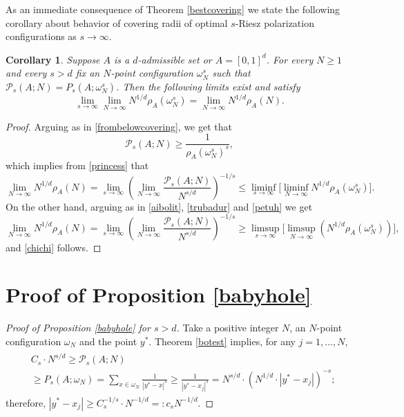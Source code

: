 \documentclass[12pt]{amsart}
\newtheorem{corollary}[theorem]{Corollary}
\theoremstyle{definition}
\def\sli{\sum\limits}
\newcommand{\1}{\mathbf{1}}
\newcommand{\PP}{\mathcal{P}}
\begin{document}
As an immediate consequence of Theorem \ref{bestcovering} we state the following corollary about behavior of covering radii of optimal $s$-Riesz polarization configurations as $s\to \infty$.
\begin{corollary}
Suppose $A$ is a $d$-admissible set or $A=[0,1]^d$. For every $N\geqslant 1$ and every $s>d$ fix an $N$-point configuration $\omega_N^s$ such that $\PP_s(A; N)=P_s(A; \omega^s_N)$. Then the following limits exist and satisfy
\begin{equation}\label{chichi}
\lim_{s\to\infty}\lim_{N\to\infty}N^{1/d}\rho_A(\omega_N^s) = \lim_{N\to \infty}N^{1/d}\rho_A(N).
\end{equation}
\end{corollary}
\begin{proof}
Arguing as in \eqref{frombelowcovering}, we get that
$$
\PP_s(A; N)\geqslant \frac{1}{\rho_A(\omega_N^s)^{s}},
$$
which implies from \eqref{princess} that 
$$
\lim_{N\to\infty}N^{1/d}\rho_A(N)=\lim_{s\to\infty}\left(\lim_{N\to \infty}\frac{\PP_s(A; N)}{N^{s/d}}\right)^{-1/s} \leqslant \liminf_{s\to\infty}\Big[\liminf_{N\to\infty}N^{1/d}\rho_A(\omega_N^s)\Big].
$$
On the other hand, arguing as in \eqref{aibolit}, \eqref{trubadur} and \eqref{petuh} we get
$$
\lim_{N\to\infty}N^{1/d}\rho_A(N)=\lim_{s\to\infty}\left(\lim_{N\to \infty}\frac{\PP_s(A; N)}{N^{s/d}}\right)^{-1/s}\geqslant \limsup_{s\to\infty}\Big[\limsup_{N\to\infty}(N^{1/d}\rho_A(\omega_N^s))\Big]	,
$$
and \eqref{chichi} follows.
\end{proof}


\section{Proof of Proposition \ref{babyhole}}\label{secappendix}

\begin{proof}[Proof of Proposition \ref{babyhole} for $s>d$]

Take a positive integer $N$, an $N$-point configuration $\omega_N$ and the point $y^*$. Theorem \ref{botest} implies, for any $j=1,\ldots, N$,
\begin{align}
\begin{split}
&C_s \cdot  N^{s/d}\geqslant \PP_s(A; N) \\
&\geqslant P_s(A; \omega_{N})=\sli_{x\in \omega_{N}} \frac{1}{|y^*-x|^s} \geqslant \frac{1}{|y^* - x_{j}|^s} = N^{s/d}\cdot (N^{1/d}\cdot|y^*-x_{j}|)^{-s};
\end{split}
\end{align}
therefore, $|y^*-x_j|\geqslant C_s^{-1/s} \cdot N^{-1/d}=:c_sN^{-1/d}$. 
\end{proof}
\end{document}
